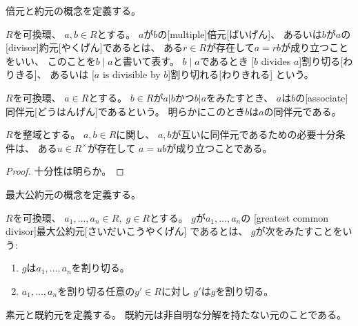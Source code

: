 \documentclass[report]{jlreq}
\begin{document}
倍元と約元の概念を定義する。

\begin{definition}[倍元と約元]
    $R$を可換環、
    $a, b \in R$とする。
    $a$が$b$の[multiple]{倍元}[ばいげん]、
    あるいは$b$が$a$の[divisor]{約元}[やくげん]であるとは、
    ある$r \in R$が存在して$a = rb$が成り立つことをいい、
    このことを$b \mid a$と書いて表す。
    $b \mid a$であるとき
    [$b$ divides $a$]{割り切る}[わりきる]、
    あるいは
    [$a$ is divisible by $b$]{割り切れる}[わりきれる]
    という。
\end{definition}

\begin{definition}[同伴元]
    $R$を可換環、
    $a \in R$とする。
    $b \in R$が$a | b$かつ$b | a$をみたすとき、
    $a$は$b$の[associate]{同伴元}[どうはんげん]であるという。
    明らかにこのとき$b$は$a$の同伴元である。
\end{definition}

\begin{theorem}[整域における同伴元の特徴付け]
    $R$を整域とする。
    $a, b \in R$に関し、
    $a, b$が互いに同伴元であるための必要十分条件は、
    ある$u \in R^\times$が存在して
    $a = ub$が成り立つことである。
\end{theorem}

\begin{proof}
    十分性は明らか。

    \TODO{}
\end{proof}

最大公約元の概念を定義する。

\begin{definition}[最大公約元]
    $R$を可換環、
    $a_1, \dots, a_n \in R, \; g \in R$とする。
    $g$が$a_1, \dots, a_n$の
    [greatest common divisor]{最大公約元}[さいだいこうやくげん]
    であるとは、
    $g$が次をみたすことをいう:
    \begin{enumerate}
        \item $g$は$a_1, \dots, a_n$を割り切る。
        \item $a_1, \dots, a_n$を割り切る任意の$g' \in R$に対し
            $g'$は$g$を割り切る。
    \end{enumerate}
\end{definition}

素元と既約元を定義する。
既約元は非自明な分解を持たない元のことである。
\end{document}
